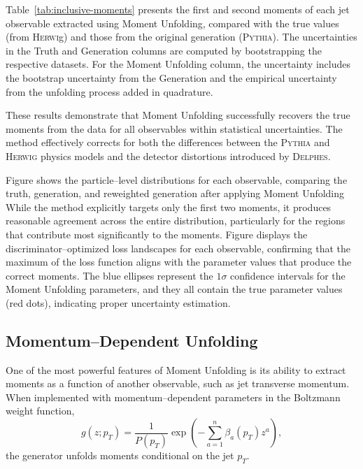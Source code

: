            Table~\ref{tab:inclusive-moments} presents the first and second moments of each jet observable extracted using Moment Unfolding, compared with the true values (from \textsc{Herwi}g) and those from the original generation (\textsc{Pythia}).
            The uncertainties in the Truth and Generation columns are computed by bootstrapping the respective datasets.
            For the Moment Unfolding column, the uncertainty includes the bootstrap uncertainty from the Generation and the empirical uncertainty from the unfolding process added in quadrature.
            
            These results demonstrate that Moment Unfolding successfully recovers the true moments from the data for all observables within statistical uncertainties.
            The method effectively corrects for both the differences between the \textsc{Pythia} and \textsc{Herwig} physics models and the detector distortions introduced by \textsc{Delphes}.

            Figure  shows the particle--level distributions for each observable, comparing the truth, generation, and reweighted generation after applying Moment Unfolding
            While the method explicitly targets only the first two moments, it produces reasonable agreement across the entire distribution, particularly for the regions that contribute most significantly to the moments.
            Figure  displays the discriminator--optimized loss landscapes for each observable, confirming that the maximum of the loss function aligns with the parameter values that produce the correct moments.
            The blue ellipses represent the \(1\sigma\) confidence intervals for the Moment Unfolding parameters, and they all contain the true parameter values (red dots), indicating proper uncertainty estimation.

    
    \subsection{Momentum--Dependent Unfolding}
        One of the most powerful features of Moment Unfolding is its ability to extract moments as a function of another observable, such as jet transverse momentum.
        When implemented with momentum--dependent parameters in the Boltzmann weight function,
        \[
            g(z; p_T) = \frac{1}{P(p_T)}\exp\left(-\sum_{a=1}^n\beta_a(p_T)z^a\right),
        \]
        the generator unfolds moments conditional on the jet \(p_T\).
        
